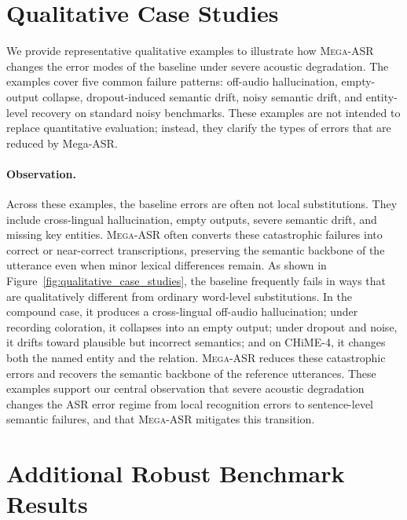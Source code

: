 \documentclass{article}
\begin{document}


\clearpage
\appendix

\newpage
\section{Qualitative Case Studies}

We provide representative qualitative examples to illustrate how \textsc{Mega-ASR} changes
the error modes of the baseline under severe acoustic degradation. The examples
cover five common failure patterns: off-audio hallucination, empty-output
collapse, dropout-induced semantic drift, noisy semantic drift, and entity-level
recovery on standard noisy benchmarks. These examples are not intended to
replace quantitative evaluation; instead, they clarify the types of errors that
are reduced by Mega-ASR.

\paragraph{Observation.}
Across these examples, the baseline errors are often not local substitutions.
They include cross-lingual hallucination, empty outputs, severe semantic drift,
and missing key entities. \textsc{Mega-ASR} often converts these catastrophic failures
into correct or near-correct transcriptions, preserving the semantic backbone of
the utterance even when minor lexical differences remain.
As shown in Figure~\ref{fig:qualitative_case_studies}, the baseline frequently
fails in ways that are qualitatively different from ordinary word-level
substitutions. In the compound case, it produces a cross-lingual off-audio
hallucination; under recording coloration, it collapses into an empty output;
under dropout and noise, it drifts toward plausible but incorrect semantics; and
on CHiME-4, it changes both the named entity and the relation. \textsc{Mega-ASR} reduces
these catastrophic errors and recovers the semantic backbone of the reference
utterances. These examples support our central observation that severe acoustic
degradation changes the ASR error regime from local recognition errors to
sentence-level semantic failures, and that \textsc{Mega-ASR} mitigates this transition.

\newpage
\section{Additional Robust Benchmark Results}
\label{app:additional_robust_results}
\end{document}
